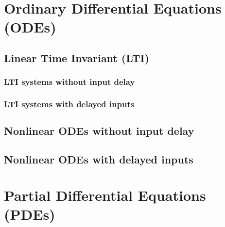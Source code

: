 \section{Ordinary Differential Equations (ODEs)} {
    \subsection{Linear Time Invariant (LTI)} {
        \subsubsection*{LTI systems without input delay} {
            
        }
        \subsubsection*{LTI systems with delayed inputs} {

        }

    }
    \subsection{Nonlinear ODEs without input delay} {

    }
    \subsection{Nonlinear ODEs with delayed inputs} {

    }
}
\section{Partial Differential Equations (PDEs)} {

}
